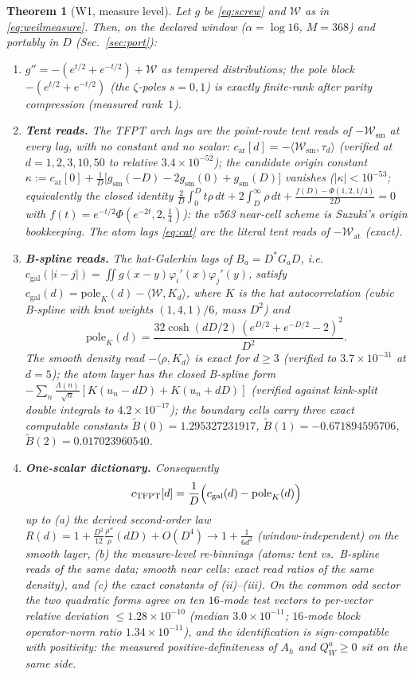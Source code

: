 \documentclass[11pt,a4paper]{article}
\newtheorem{theorem}{Theorem}
\theoremstyle{remark}
\newcommand{\Lam}{\Lambda}
\begin{document}
\begin{theorem}[W1, measure level]\label{thm:w1}
Let $g$ be \eqref{eq:screw} and $\mathcal W$ as in
\eqref{eq:weilmeasure}.  Then, on the declared window
($\alpha=\log16$, $M=368$) and portably in $D$ (Sec.~\ref{sec:port}):
\begin{enumerate}
\item[(i)] $g''=-(e^{t/2}+e^{-t/2})+\mathcal W$ as tempered
distributions; the pole block $-(e^{t/2}+e^{-t/2})$ (the $\zeta$-poles
$s=0,1$) is exactly finite-rank after parity compression (measured
rank~$1$).
\item[(ii)] \textbf{Tent reads.}  The TFPT arch lags are the point-route
tent reads of $-\mathcal W_{\mathrm{sm}}$ at \emph{every} lag, with no
constant and no scalar:
$c_{\mathrm{ar}}[d]=-\langle\mathcal W_{\mathrm{sm}},\tau_d\rangle$
(verified at $d=1,2,3,10,50$ to relative $3.4\times10^{-52}$); the
candidate origin constant
$\kappa:=c_{\mathrm{ar}}[0]+\tfrac1D\bigl[g_{\mathrm{sm}}(-D)
-2g_{\mathrm{sm}}(0)+g_{\mathrm{sm}}(D)\bigr]$ \emph{vanishes}
($|\kappa|<10^{-53}$; equivalently the closed identity
$\tfrac2D\int_0^Dt\rho\,dt+2\int_D^\infty\!\rho\,dt
+\tfrac{f(D)-\Phi(1,2,1/4)}{2D}=0$ with
$f(t)=e^{-t/2}\Phi(e^{-2t},2,\tfrac14)$): the v563 near-cell scheme
\emph{is} Suzuki's origin bookkeeping.  The atom lags \eqref{eq:cat}
are the literal tent reads of $-\mathcal W_{\mathrm{at}}$ (exact).
\item[(iii)] \textbf{B-spline reads.}  The hat-Galerkin lags of
$B_a=D^*G_aD$, i.e.
$c_{\mathrm{gal}}(|i-j|)=\iint g(x-y)\varphi_i'(x)\varphi_j'(y)$,
satisfy $c_{\mathrm{gal}}(d)=\mathrm{pole}_K(d)
-\langle\mathcal W,K_d\rangle$, where $K$ is the hat autocorrelation
(cubic B-spline with knot weights $(1,4,1)/6$, mass $D^2$) and
\[
\mathrm{pole}_K(d)=\frac{32\cosh(dD/2)\,(e^{D/2}+e^{-D/2}-2)^2}{D^2}.
\]
The smooth density read $-\langle\rho,K_d\rangle$ is exact for
$d\ge3$ (verified to $3.7\times10^{-31}$ at $d=5$); the atom layer has
the closed B-spline form
$-\sum_n\frac{\Lam(n)}{\sqrt n}[K(u_n-dD)+K(u_n+dD)]$ (verified against
kink-split double integrals to $4.2\times10^{-17}$); the boundary cells
carry three exact computable constants
$\tilde B(0)=1.295327231917$, $\tilde B(1)=-0.671894595706$,
$\tilde B(2)=0.017023960540$.
\item[(iv)] \textbf{One-scalar dictionary.}  Consequently
\[
c_{\mathrm{TFPT}}[d]
=\frac1D\Bigl(c_{\mathrm{gal}}(d)-\mathrm{pole}_K(d)\Bigr)
\]
up to (a) the derived second-order law
$R(d)=1+\tfrac{D^2}{12}\tfrac{\rho''}{\rho}(dD)+O(D^4)\to1+\tfrac1{6d^2}$
(window-independent) on the smooth layer, (b) the measure-level
re-binnings (atoms: tent vs.\ B-spline reads of the same data; smooth
near cells: exact read ratios of the same density), and (c) the exact
constants of (ii)--(iii).  On the common odd sector the two quadratic
forms agree on ten $16$-mode test vectors to per-vector relative
deviation $\le1.28\times10^{-10}$ (median $3.0\times10^{-11}$;
$16$-mode block operator-norm ratio $1.34\times10^{-11}$), and the
identification is \emph{sign-compatible with positivity}: the measured
positive-definiteness of $A_h$ and $Q^a_W\ge0$ sit on the same side.
\end{enumerate}
\end{theorem}
\end{document}
